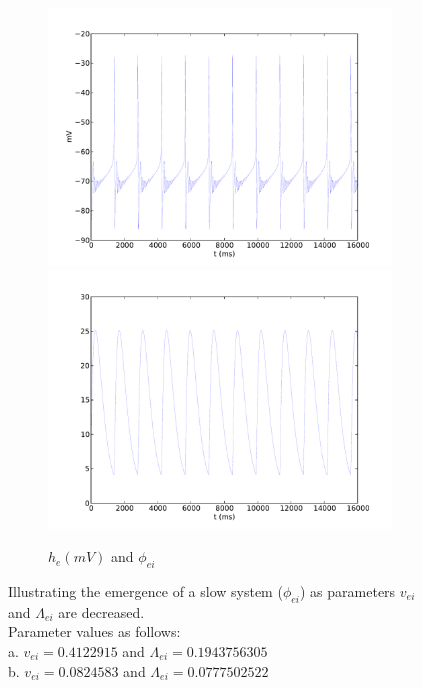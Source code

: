 \documentclass[a4paper,12pt]{article}
\begin{document}
\begin{figure}
	\begin{subfigure}[b]{1\textwidth}
		\includegraphics[scale=0.32]{chosen-frontiers-2012/00214-1-0_1-5-0_1-he-phi.pdf}
		\includegraphics[scale=0.32]{chosen-frontiers-2012/00214-1-0_1-5-0_1-phi_ei-phi}
		\label{fig:214-1-0_1-5-0_2}
		\caption{$h_e (mV)$ and $\phi_{ei}$}
	\end{subfigure}
	\label{fig:phi_dyn}
	\caption{Illustrating the emergence of a slow system ($\phi_{ei}$) as parameters $v_{ei}$ and $\Lambda_{ei}$ are decreased. \\
	Parameter values as follows:\\
	a. $v_{ei} = 0.4122915$ and $\Lambda_{ei} = 0.1943756305$\\
	b. $v_{ei} = 0.0824583$ and $\Lambda_{ei} = 0.0777502522$\\
}
\end{figure}
\end{document}
